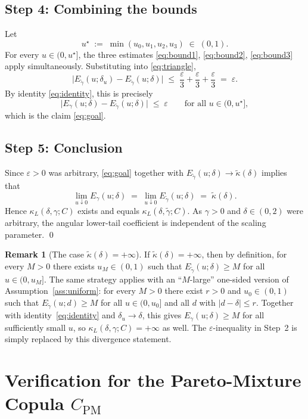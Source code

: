 \documentclass[11pt]{article}
\theoremstyle{definition}
\newtheorem{remark}[theorem]{Remark}
\newcommand{\PM}{\mathrm{PM}}
\newcommand{\eps}{\varepsilon}
\begin{document}
\subsection*{Step 4: Combining the bounds}

Let
\[
u^\star \;:=\; \min(u_0,u_1,u_2,u_3) \;\in\;(0,1).
\]
For every $u\in(0,u^\star]$, the three estimates
\eqref{eq:bound1}, \eqref{eq:bound2}, \eqref{eq:bound3} apply
simultaneously. Substituting into \eqref{eq:triangle},
\[
\bigl|E_{\tilde\gamma}(u;\delta_u)-E_{\tilde\gamma}(u;\delta)\bigr|
\;\le\;\frac{\eps}{3}+\frac{\eps}{3}+\frac{\eps}{3}\;=\;\eps.
\]
By identity \eqref{eq:identity}, this is precisely
\[
\bigl|E_{\gamma}(u;\delta)-E_{\tilde\gamma}(u;\delta)\bigr|\;\le\;\eps
\qquad\text{for all }u\in(0,u^\star],
\]
which is the claim \eqref{eq:goal}.

\subsection*{Step 5: Conclusion}

Since $\eps>0$ was arbitrary, \eqref{eq:goal} together with
$E_{\tilde\gamma}(u;\delta)\to\tilde\kappa(\delta)$ implies that
\[
\lim_{u\downarrow 0}E_\gamma(u;\delta)
\;=\;\lim_{u\downarrow 0}E_{\tilde\gamma}(u;\delta)
\;=\;\tilde\kappa(\delta).
\]
Hence $\kappa_L(\delta,\gamma;C)$ exists and equals
$\kappa_L(\delta,\tilde\gamma;C)$. As $\gamma>0$ and $\delta\in(0,2)$
were arbitrary, the angular lower-tail coefficient is independent of
the scaling parameter. \qed

\begin{remark}[The case $\tilde\kappa(\delta)=+\infty$]
If $\tilde\kappa(\delta)=+\infty$, then by definition, for every
$M>0$ there exists $u_M\in(0,1)$ such that
$E_{\tilde\gamma}(u;\delta)\ge M$ for all $u\in(0,u_M]$. The same
strategy applies with an ``$M$-large'' one-sided version of
Assumption~\ref{ass:uniform}: for every $M>0$ there exist $r>0$ and
$u_0\in(0,1)$ such that $E_{\tilde\gamma}(u;d)\ge M$ for all
$u\in(0,u_0]$ and all $d$ with $|d-\delta|\le r$. Together with
identity~\eqref{eq:identity} and $\delta_u\to\delta$, this gives
$E_\gamma(u;\delta)\ge M$ for all sufficiently small $u$, so
$\kappa_L(\delta,\gamma;C)=+\infty$ as well. The $\eps$-inequality in
Step~2 is simply replaced by this divergence statement.
\end{remark}

\section{Verification for the Pareto-Mixture Copula $C_{\PM}$}
\end{document}
